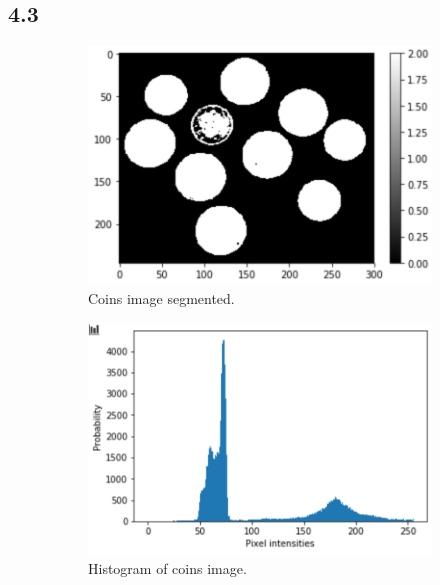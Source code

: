 \subsection*{4.3}
\begin{figure}[H]
	\centering
	\begin{subfigure}[b]{0.45\linewidth}
		\centering
		\includegraphics[width=\linewidth]{Materials/E4/coins_seg}
		\caption{Coins image segmented.}
	\end{subfigure}
	\hfill
	\begin{subfigure}[b]{0.45\linewidth}
		\centering
		\includegraphics[width=\linewidth]{Materials/E4/coins_hist}
		\caption{Histogram of coins image.}
	\end{subfigure}
	\\
	\begin{subfigure}[b]{0.45\linewidth}
		\centering

\end{subfigure}
\end{figure}
